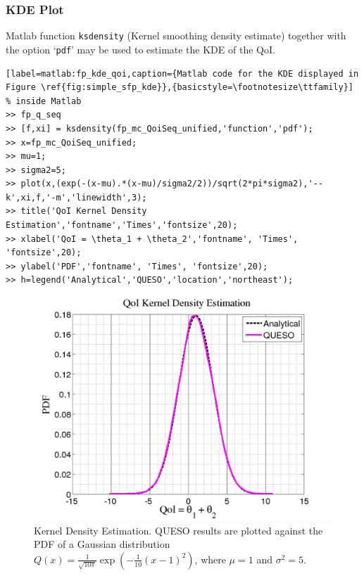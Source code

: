 \subsubsection{KDE Plot}

Matlab function \verb+ksdensity+ (Kernel smoothing density estimate) together with the option `\verb+pdf+' may be used to estimate the KDE of the QoI. 

\begin{lstlisting}[label=matlab:fp_kde_qoi,caption={Matlab code for the KDE displayed in Figure \ref{fig:simple_sfp_kde}},{basicstyle=\footnotesize\ttfamily}]
% inside Matlab
>> fp_q_seq
>> [f,xi] = ksdensity(fp_mc_QoiSeq_unified,'function','pdf');
>> x=fp_mc_QoiSeq_unified;
>> mu=1;
>> sigma2=5;
>> plot(x,(exp(-(x-mu).*(x-mu)/sigma2/2))/sqrt(2*pi*sigma2),'--k',xi,f,'-m','linewidth',3);
>> title('QoI Kernel Density Estimation','fontname','Times','fontsize',20);
>> xlabel('QoI = \theta_1 + \theta_2','fontname', 'Times', 'fontsize',20);
>> ylabel('PDF','fontname', 'Times', 'fontsize',20);
>> h=legend('Analytical','QUESO','location','northeast');
\end{lstlisting}


\begin{figure}[htpb]
\centering 
\includegraphics[scale=0.35]{rawfigs/simple_fp_qoi_kde.png}
\vspace{-10pt}
\caption{Kernel Density Estimation. QUESO results are plotted against the PDF of a Gaussian distribution $Q(x)=   \frac{1}{ \sqrt{10\pi}} \exp\left(-\frac{1}{10}(x-1)^2 \right)$, where $\mu=1$ and $\sigma^2=5$.}
\label{fig:simple_sfp_kde}
\end{figure}


